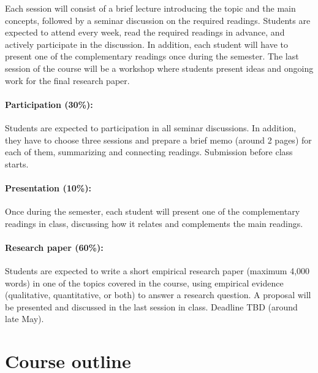 \documentclass[12pt, a4paper]{article}
\begin{document}
Each session will consist of a brief lecture introducing the topic and the main concepts, followed by a seminar discussion on the required readings. Students are expected to attend every week, read the required readings in advance, and actively participate in the discussion.
In addition, each student will have to present one of the complementary readings once during the semester.
The last session of the course will be a workshop where students present ideas and ongoing work for the final research paper.


\paragraph{Participation (30\%):} Students are expected to participation in all seminar discussions. In addition, they have to choose three sessions and prepare a brief memo (around 2 pages) for each of them, summarizing and connecting readings. Submission before class starts.

\vspace{-5pt}\paragraph{Presentation (10\%):} Once during the semester, each student will present one of the complementary readings in class, discussing how it relates and complements the main readings.

\vspace{-5pt}\paragraph{Research paper (60\%):} Students are expected to write a short empirical research paper (maximum 4,000 words) in one of the topics covered in the course, using empirical evidence (qualitative, quantitative, or both) to answer a research question. A proposal will be presented and discussed in the last session in class. Deadline TBD (around late May).

\newpage
\section{Course outline}
\end{document}
